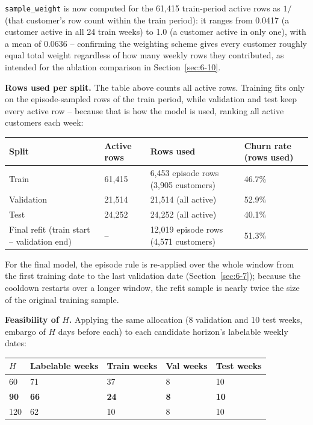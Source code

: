 \texttt{sample\_weight} is now computed for the 61,415 train-period active rows as $1 /$ (that customer's row count within the train period): it ranges from 0.0417 (a customer active in all 24 train weeks) to 1.0 (a customer active in only one), with a mean of 0.0636 -- confirming the weighting scheme gives every customer roughly equal total weight regardless of how many weekly rows they contributed, as intended for the ablation comparison in Section~\ref{sec:6-10}.

\textbf{Rows used per split.} The table above counts all active rows. Training fits only on the episode-sampled rows of the train period, while validation and test keep every active row -- because that is how the model is used, ranking all active customers each week:

\begin{center}
\begin{tabular}{@{}p{3.4cm}p{2.6cm}p{4.2cm}p{2.3cm}@{}}
    \toprule
    Split & Active rows & Rows used & Churn rate (rows used) \\
    \midrule
    Train & 61,415 & 6,453 episode rows (3,905 customers) & 46.7\% \\
    Validation & 21,514 & 21,514 (all active) & 52.9\% \\
    Test & 24,252 & 24,252 (all active) & 40.1\% \\
    Final refit (train start -- validation end) & -- & 12,019 episode rows (4,571 customers) & 51.3\% \\
    \bottomrule
\end{tabular}
\end{center}

For the final model, the episode rule is re-applied over the whole window from the first training date to the last validation date (Section~\ref{sec:6-7}); because the cooldown restarts over a longer window, the refit sample is nearly twice the size of the original training sample.

\textbf{Feasibility of $H$.} Applying the same allocation (8 validation and 10 test weeks, embargo of $H$ days before each) to each candidate horizon's labelable weekly dates:

\begin{center}
\begin{tabular}{@{}p{1.8cm}p{2.6cm}p{2.3cm}p{2.1cm}p{2.1cm}@{}}
    \toprule
    $H$ & Labelable weeks & Train weeks & Val weeks & Test weeks \\
    \midrule
    60 & 71 & 37 & 8 & 10 \\
    \textbf{90} & \textbf{66} & \textbf{24} & \textbf{8} & \textbf{10} \\
    120 & 62 & 10 & 8 & 10 \\
    \bottomrule
\end{tabular}
\end{center}

